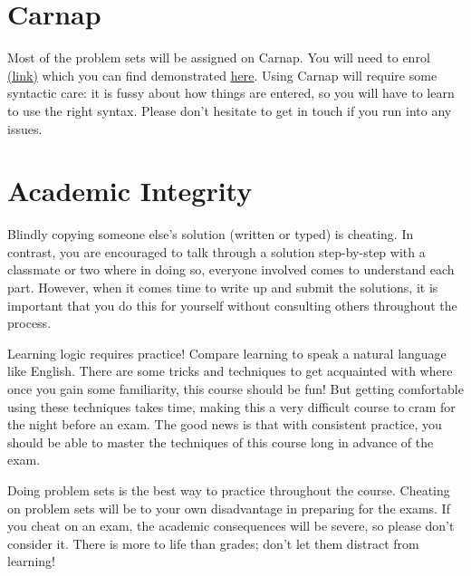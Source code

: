 \documentclass[letterpaper]{inzane_syllabus} %
\begin{document}
\vspace{0.5cm}
\section{Carnap}

Most of the problem sets will be assigned on Carnap.
You will need to enrol \href{https://carnap.io/enroll/Logic%20I}{(link)} which you can find demonstrated \href{https://youtu.be/lmkWcxqxEZk}{here}.
Using Carnap will require some syntactic care: it is fussy about how things are entered, so you will have to learn to use the right syntax.
Please don't hesitate to get in touch if you run into any issues.


\newpage %

\makeSide %


\vspace{0.5cm}
\section{Academic Integrity}

Blindly copying someone else’s solution (written or typed) is cheating.
In contrast, you are encouraged to talk through a solution step-by-step with a classmate or two where in doing so, everyone involved comes to understand each part.
However, when it comes time to write up and submit the solutions, it is important that you do this for yourself without consulting others throughout the process.

Learning logic requires practice! 
Compare learning to speak a natural language like English. %
There are some tricks and techniques to get acquainted with where once you gain some familiarity, this course should be fun!
But getting comfortable using these techniques takes time, making this a very difficult course to cram for the night before an exam.
The good news is that with consistent practice, you should be able to master the techniques of this course long in advance of the exam.

Doing problem sets is the best way to practice throughout the course.
Cheating on problem sets will be to your own disadvantage in preparing for the exams.
If you cheat on an exam, the academic consequences will be severe, so please don't consider it.
There is more to life than grades; don't let them distract from learning!
\end{document}
